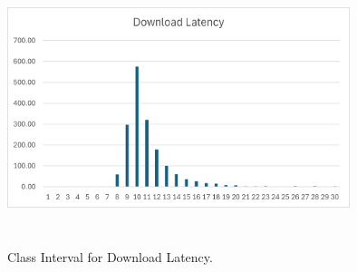 \documentclass[conference]{IEEEtran}
\begin{document}
\begin{figure}[htbp]
    \centerline{\includegraphics[width=10cm,height=8cm,keepaspectratio]{Figures/Picture32.png}}
    \caption{Class Interval for Download Latency.}
    \label{fig17}
\end{figure}
\end{document}
